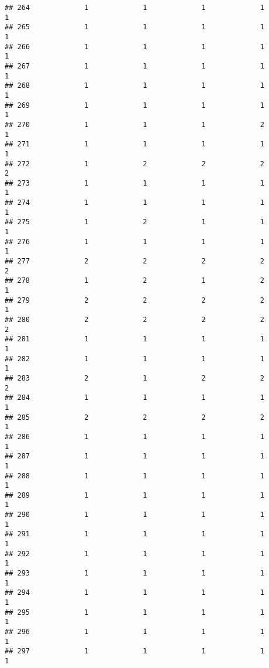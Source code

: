 \documentclass[
]{article}
\begin{document}
\begin{verbatim}
## 264             1             1             1             1             1
## 265             1             1             1             1             1
## 266             1             1             1             1             1
## 267             1             1             1             1             1
## 268             1             1             1             1             1
## 269             1             1             1             1             1
## 270             1             1             1             2             1
## 271             1             1             1             1             1
## 272             1             2             2             2             2
## 273             1             1             1             1             1
## 274             1             1             1             1             1
## 275             1             2             1             1             1
## 276             1             1             1             1             1
## 277             2             2             2             2             2
## 278             1             2             1             2             1
## 279             2             2             2             2             1
## 280             2             2             2             2             2
## 281             1             1             1             1             1
## 282             1             1             1             1             1
## 283             2             1             2             2             2
## 284             1             1             1             1             1
## 285             2             2             2             2             1
## 286             1             1             1             1             1
## 287             1             1             1             1             1
## 288             1             1             1             1             1
## 289             1             1             1             1             1
## 290             1             1             1             1             1
## 291             1             1             1             1             1
## 292             1             1             1             1             1
## 293             1             1             1             1             1
## 294             1             1             1             1             1
## 295             1             1             1             1             1
## 296             1             1             1             1             1
## 297             1             1             1             1             1

\end{verbatim}
\end{document}
